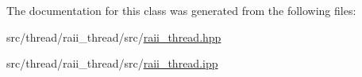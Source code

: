 The documentation for this class was generated from the following files\-:\begin{DoxyCompactItemize}
\item 
src/thread/raii\-\_\-thread/src/\hyperlink{raii__thread_8hpp}{raii\-\_\-thread.\-hpp}\item 
src/thread/raii\-\_\-thread/src/\hyperlink{raii__thread_8ipp}{raii\-\_\-thread.\-ipp}\end{DoxyCompactItemize}
